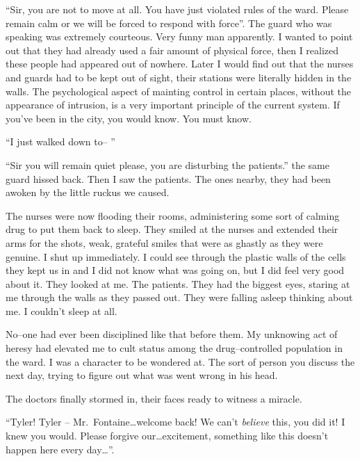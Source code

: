 ``Sir, you are not to move at all. You have just violated rules of the ward. Please remain calm or we will be forced to respond with force''. The guard who was speaking was extremely courteous. Very funny man apparently. I wanted to point out that they had already used a fair amount of physical force, then I realized these people had appeared out of nowhere. Later I would find out that the nurses and guards had to be kept out of sight, their stations were literally hidden in the walls. The psychological aspect of mainting control in certain places, without the appearance of intrusion, is a very important principle of the current system. If you've been in the city, you would know. You must know. 

``I just walked down to-- ''

``Sir you will remain quiet please, you are disturbing the patients.'' the same guard hissed back. Then I saw the patients. The ones nearby, they had been awoken by the little ruckus we caused.

The nurses were now flooding their rooms, administering some sort of calming drug to put them back to sleep. They smiled at the nurses and extended their arms for the shots, weak, grateful smiles that were as ghastly as they were genuine. I shut up immediately. I could see through the plastic walls of the cells they kept us in and I did not know what was going on, but I did feel very good about it. They looked at me. The patients. They had the biggest eyes, staring at me through the walls as they passed out. They were falling asleep thinking about me. I couldn't sleep at all.

No--one had ever been disciplined like that before them. My unknowing act of heresy had elevated me to cult status among the drug--controlled population in the ward. I was a character to be wondered at. The sort of person you discuss the next day, trying to figure out what was went wrong in his head. 

The doctors finally stormed in, their faces ready to witness a miracle.

``Tyler! Tyler -- Mr.~Fontaine\ldots welcome back! We can't \textit{believe} this, you did it! I knew you would. Please forgive our\ldots excitement, something like this doesn't happen here every day\ldots''.

